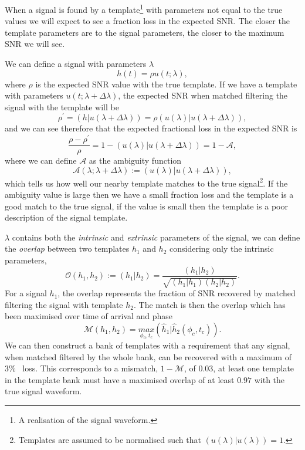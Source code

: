 When a signal is found by a template\footnote{A realisation of the \gwadj signal waveform.} with parameters not equal to the true values we will expect to see a fraction loss in the expected SNR. The closer the template parameters are to the signal parameters, the closer to the maximum SNR we will see. 

We can define a signal with parameters $\lambda$
%
\begin{equation}
    h(t) = \rho u(t;\lambda),
\end{equation}
where $\rho$ is the expected SNR value with the true template. If we have a template with parameters $u(t;\lambda + \Delta \lambda)$, the expected SNR when matched filtering the signal with the template will be
%
\begin{equation}
    \rho^{\prime} = (h|u(\lambda + \Delta \lambda)) = \rho(u(\lambda)|u(\lambda + \Delta \lambda)),
\end{equation}
%
and we can see therefore that the expected fractional loss in the expected SNR is
%
\begin{equation}
    \frac{\rho - \rho^{\prime}}{\rho} = 1 - (u(\lambda)|u(\lambda + \Delta \lambda)) = 1 - \mathcal{A},
\end{equation}
%
where we can define $\mathcal{A}$ as the ambiguity function
%
\begin{equation}
    \mathcal{A}(\lambda;\lambda + \Delta \lambda) := (u(\lambda)|u(\lambda + \Delta \lambda)),
\end{equation}
%
which tells us how well our nearby template matches to the true signal\footnote{Templates are assumed to be normalised such that $(u(\lambda)|u(\lambda)) = 1$.}. If the ambiguity value is large then we have a small fraction loss and the template is a good match to the true signal, if the value is small then the template is a poor description of the signal template.


$\lambda$ contains both the \textit{intrinsic} and \textit{extrinsic} parameters of the signal, we can define the \textit{overlap} between two templates $h_{1}$ and $h_{2}$ considering only the intrinsic parameters,
%
\begin{equation}
    \mathcal{O}(h_{1}, h_{2}) := (h_{1} | h_{2}) = \frac{(h_{1} | h_{2})}{\sqrt{(h_{1} | h_{1})(h_{2} | h_{2})}}.
\end{equation}
%
For a signal $h_{1}$, the overlap represents the fraction of SNR recovered by matched filtering the signal with template $h_{2}$. The match is then the overlap which has been maximised over time of arrival and phase~\cite{Harry_Lundgren:2012}
%
\begin{equation}
    \mathcal{M}(h_{1}, h_{2}) = \underset{\phi_0, t_{c}}{max}(\hat{h}_{1}|\hat{h}_{2}(\phi_{c}, t_{c})).
\end{equation}
%
We can then construct a bank of templates with a requirement that any signal, when matched filtered by the whole bank, can be recovered with a maximum of $3\%$~\cite{Owen_Sathya:1999} loss. This corresponds to a mismatch, $1 - \mathcal{M}$, of $0.03$, at least one template in the template bank must have a maximised overlap of at least $0.97$ with the true signal waveform.

